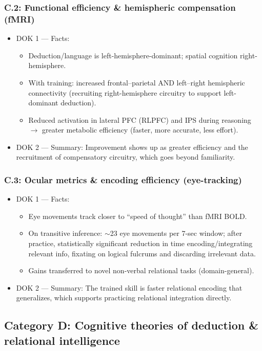 \documentclass[11pt]{article}
\begin{document}
\subsubsection*{C.2: Functional efficiency \& hemispheric compensation (fMRI)}
\begin{itemize}
\item DOK 1 --- Facts:
\begin{itemize}
\item Deduction/language is left-hemisphere-dominant; spatial cognition right-hemisphere.
\item With training: increased frontal--parietal AND left--right hemispheric connectivity (recruiting right-hemisphere circuitry to support left-dominant deduction).
\item Reduced activation in lateral PFC (RLPFC) and IPS during reasoning $\rightarrow$ greater metabolic efficiency (faster, more accurate, less effort).
\end{itemize}
\item DOK 2 --- Summary: Improvement shows up as greater efficiency and the recruitment of compensatory circuitry, which goes beyond familiarity.
\end{itemize}
\subsubsection*{C.3: Ocular metrics \& encoding efficiency (eye-tracking)}
\begin{itemize}
\item DOK 1 --- Facts:
\begin{itemize}
\item Eye movements track closer to \enquote{speed of thought} than fMRI BOLD.
\item On transitive inference: $\sim$23 eye movements per 7-sec window; after practice, statistically significant reduction in time encoding/integrating relevant info, fixating on logical fulcrums and discarding irrelevant data.
\item Gains transferred to novel non-verbal relational tasks (domain-general).
\end{itemize}
\item DOK 2 --- Summary: The trained skill is faster relational encoding that generalizes, which supports practicing relational integration directly.
\end{itemize}

\subsection*{Category D: Cognitive theories of deduction \& relational intelligence}
\end{document}
